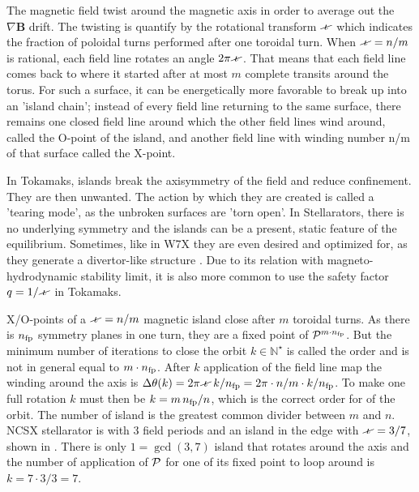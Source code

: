 The magnetic field twist around the magnetic axis in order to average out the $\nabla\textbf{B}$ drift. The twisting is quantify by the rotational transform $\iotaslash$ which indicates the fraction of poloidal turns performed after one toroidal turn. When $\iotaslash = n/m$ is rational, each field line rotates an angle $2\pi\iotaslash$. That means that each field line comes back to where it started after at most $m$ complete transits around the torus. For such a surface, it can be energetically more favorable to break up into an 'island chain'; instead of every field line returning to the same surface, there remains one closed field line around which the other field lines wind around, called the O-point of the island, and another field line with winding number n/m of that surface called the X-point. 

In Tokamaks, islands break the axisymmetry of the field and reduce confinement. They are then unwanted. The action by which they are created is called a 'tearing mode', as the unbroken surfaces are 'torn open'. In Stellarators, there is no underlying symmetry and the islands can be a present, static feature of the equilibrium. Sometimes, like in W7X they are even desired and optimized for, as they generate a divertor-like structure \cite{feng_review_2022}. Due to its relation with magneto-hydrodynamic stability limit, it is also more common to use the safety factor $q=1/\iotaslash$ in Tokamaks.

X/O-points of a $\iotaslash = n/m$ magnetic island close after $m$ toroidal turns. As there is $n_\text{fp}$ symmetry planes in one turn, they are a fixed point of $\mathcal{P}^{m\cdot n_\text{fp}}$. But the minimum number of iterations to close the orbit $k\in\mathbb{N}^\star$ is called the order and is not in general equal to $m\cdot n_\text{fp}$. After $k$ application of the field line map the winding around the axis is $\Delta\theta(k) = 2\pi\iotaslash\,k/\nfp = 2\pi\cdot n/m \cdot k/\nfp$. To make one full rotation $k$ must then be $k = m\,n_\text{fp}/n$, which is the correct order for of the orbit. The number of island is the greatest common divider between $m$ and $n$. NCSX stellarator is with 3 field periods and an island in the edge with $\iotaslash = 3/7$, shown in . There is only $1 = \gcd(3,7)$ island that rotates around the axis and the number of application of $\mathcal{P}$ for one of its fixed point to loop around is $k = 7\cdot3/3 = 7$.

